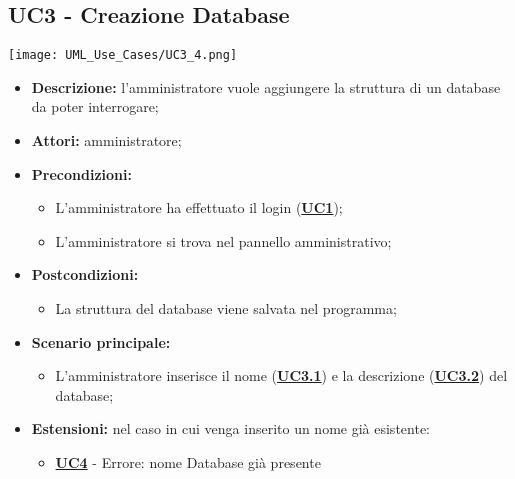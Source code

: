 \subsection{UC3 - Creazione Database}
\label{sec:UC3}
\texttt{[image: UML\_Use\_Cases/UC3\_4.png]}
\begin{itemize}
	\item \textbf{Descrizione:} l’amministratore vuole aggiungere la struttura di un database da poter interrogare;
	\item \textbf{Attori:} amministratore;
	\item \textbf{Precondizioni:} 
	\begin{itemize}
		\item L’amministratore ha effettuato il login (\hyperref[sec:UC1]{\textbf{UC1}});
		\item L’amministratore si trova nel pannello amministrativo;
	\end{itemize}
	\item \textbf{Postcondizioni:} 
	\begin{itemize}
		\item La struttura del database viene salvata nel programma;
	\end{itemize}
	\item \textbf{Scenario principale:} 
	\begin{itemize}
		\item L’amministratore inserisce il nome (\hyperref[sec:UC3.1]{\textbf{UC3.1}}) e la descrizione (\hyperref[sec:UC3.2]{\textbf{UC3.2}}) del database;
	\end{itemize}
	\item \textbf{Estensioni:} nel caso in cui venga inserito un nome già esistente:
	\begin{itemize}
		\item \hyperref[sec:UC4]{\textbf{UC4}} - Errore: nome Database già presente
	\end{itemize}
\end{itemize}

